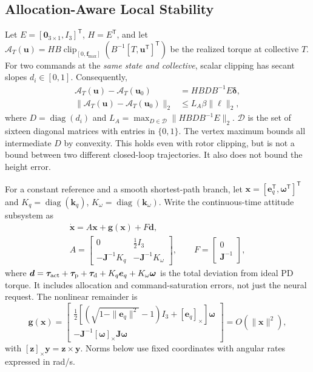 \documentclass[letterpaper, 10 pt, conference]{ieeeconf}
\newcommand{\T}{^{\mathsf T}}
\newcommand{\clip}{\operatorname{clip}}
\begin{document}
\subsection{Allocation-Aware Local Stability}
\label{sec:local}
Let $E=[\bm0_{3\times1},I_3]\T$, $H=E\T$, and let
$\mathcal A_T(\bm u)=HB\clip_{[0,\bm f_{\max}]}(B^{-1}[T,\bm u\T]\T)$
be the realized torque at collective $T$. For two commands at the
\emph{same state and collective}, scalar clipping has secant slopes
$d_i\in[0,1]$. Consequently,
\begin{align}
 \mathcal A_T(\bm u)-\mathcal A_T(\bm u_0)
 &=HBDB^{-1}E\bm\delta,\\
 \|\mathcal A_T(\bm u)-\mathcal A_T(\bm u_0)\|_2
 &\le L_A\beta\|\bm\ell\|_2,
 \label{eq:allocbound}
\end{align}
where $D=\operatorname{diag}(d_i)$ and
$L_A=\max_{D\in\mathcal D}\|HBDB^{-1}E\|_2$.
$\mathcal D$ is the set of sixteen diagonal matrices with entries
in $\{0,1\}$. The vertex maximum bounds all intermediate $D$ by convexity.
This holds even with rotor clipping, but is not a bound between two
different closed-loop trajectories. It also does not bound the height error.

For a constant reference and a smooth shortest-path branch, let
$\bm x=[\bm e_q\T,\bm\omega\T]\T$ and
$K_q=\operatorname{diag}(\bm k_q)$, $K_\omega=\operatorname{diag}(\bm k_\omega)$.
Write the continuous-time attitude subsystem as
\begin{equation}
 \begin{gathered}
 \dot{\bm x}=A\bm x+\bm g(\bm x)+F\bm d,\\
 A=\begin{bmatrix}0&\frac12I_3\\-\bm J^{-1}K_q&-\bm J^{-1}K_\omega\end{bmatrix},
 \qquad F=\begin{bmatrix}0\\\bm J^{-1}\end{bmatrix},
 \end{gathered}
 \label{eq:localmodel}
\end{equation}
where $\bm d=\bm\tau_{\rm act}+\bm\tau_{\rm p}+\bm\tau_{\rm d}
 +K_q\bm e_q+K_\omega\bm\omega$ is the total deviation from ideal PD torque.
It includes allocation and command-saturation errors, not just the neural
request. The nonlinear remainder is
\begin{equation}
 \bm g(\bm x)=\begin{bmatrix}
 \tfrac12[(\sqrt{1-\|\bm e_q\|^2}-1)I_3+[\bm e_q]_\times]\bm\omega\\
 -\bm J^{-1}[\bm\omega]_\times\bm J\bm\omega
 \end{bmatrix}=O(\|\bm x\|^2),
 \label{eq:localremainder}
\end{equation}
with $[\bm z]_\times\bm y=\bm z\times\bm y$. Norms below use fixed
coordinates with angular rates expressed in rad/s.
\end{document}
